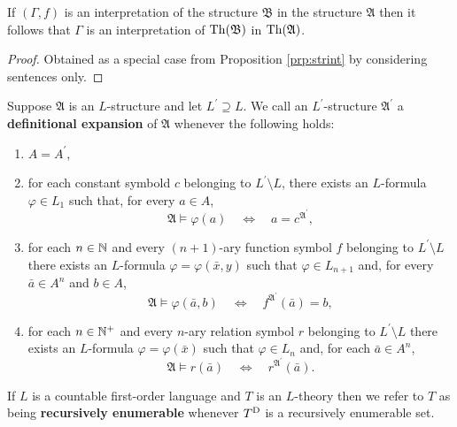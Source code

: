 \begin{cor}
	If $(\Gamma,f)$ is an interpretation of the structure $\mathfrak{B}$ in the structure $\mathfrak{A}$ then it follows that $\Gamma$ is an interpretation of $\operatorname{Th}(\mathfrak{B})$ in $\operatorname{Th}(\mathfrak{A})$.
\end{cor}
\begin{proof}
	Obtained as a special case from Proposition \ref{prp:strint} by considering sentences only.
\end{proof}

\begin{dfn}
	Suppose $\mathfrak{A}$ is an $L$-structure and let $L^\prime\supseteq L$.  We call an $L^\prime$-structure $\mathfrak{A}^\prime$ a \textbf{definitional expansion} of $\mathfrak{A}$ whenever the following holds:
	\begin{enumerate}
		\item	$A=A^\prime$,
		\item	for each constant symbold $c$ belonging to $L^\prime\setminus L$, there exists an $L$-formula $\varphi\in L_1$ such that, for every $a\in A$,
			\begin{equation}
				\mathfrak{A}\models\varphi(a)\quad\iff\quad a=c^{\mathfrak{A}^\prime},
			\end{equation}
		\item	for each $n\in\mathbb{N}$ and every $(n+1)$-ary function symbol $f$ belonging to $L^\prime\setminus L$ there exists an $L$-formula $\varphi=\varphi(\bar{x},y)$ such that $\varphi\in L_{n+1}$ and, for every $\bar{a}\in A^n$ and $b\in A$,
			\begin{equation}
				\mathfrak{A}\models\varphi(\bar{a},b)\quad\iff\quad f^{\mathfrak{A}^\prime}(\bar{a})=b,
			\end{equation}
		\item	for each $n\in\mathbb{N}^{+}$ and every $n$-ary relation symbol $r$ belonging to $L^\prime\setminus L$ there exists an $L$-formula $\varphi=\varphi(\bar{x})$ such that $\varphi\in L_n$ and, for each $\bar{a}\in A^n$,
			\begin{equation}
				\mathfrak{A}\models r(\bar{a})\quad\iff\quad r^{\mathfrak{A}^\prime}(\bar{a}).
			\end{equation}
	\end{enumerate}
\end{dfn}

\begin{dfn}
	If $L$ is a countable first-order language and $T$ is an $L$-theory then we refer to $T$ as being \textbf{recursively enumerable} whenever ${T}^\mathrm{D}$ is a recursively enumerable set.
\end{dfn}

